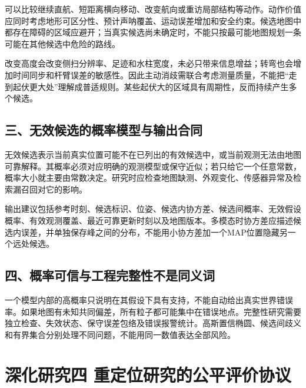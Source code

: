 可以比较继续直航、短距离横向移动、改变航向或重访局部结构等动作。动作价值应同时考虑地形可区分性、预计声呐覆盖、运动误差增加和安全约束。候选地图中都存在障碍的区域应避开；当真实候选尚未确定时，不能只按最可能地图规划一条可能在其他候选中危险的路线。

改变高度会改变侧扫分辨率、足迹和水柱宽度，未必只带来信息增益；转弯也会增加时间同步和杆臂误差的敏感性。因此主动消歧需联合考虑测量质量，不能把``走到起伏更大处''理解成普适规则。某些起伏大的区域具有周期性，反而持续产生多个候选。

\hypertarget{ux4e09ux65e0ux6548ux5019ux9009ux7684ux6982ux7387ux6a21ux578bux4e0eux8f93ux51faux5408ux540c}{%
\subsection{三、无效候选的概率模型与输出合同}\label{ux4e09ux65e0ux6548ux5019ux9009ux7684ux6982ux7387ux6a21ux578bux4e0eux8f93ux51faux5408ux540c}}

无效候选表示当前真实位置可能不在已列出的有效候选中，或当前观测无法由地图可靠解释。其概率必须对应明确的观测模型或保守近似；若只给它一个任意常数，概率大小就主要由常数决定。研究时应检查地图缺测、外观变化、传感器异常及检索漏召回对它的影响。

输出建议包括参考时刻、候选标识、位姿、候选内协方差、候选间概率、无效假设概率、有效观测覆盖、最近可靠更新时刻以及地图版本。多模态时协方差应描述候选内误差，并单独保存峰之间的分布，不能用小协方差加一个MAP位置隐藏另一个远处候选。

\hypertarget{ux56dbux6982ux7387ux53efux4fe1ux4e0eux5de5ux7a0bux5b8cux6574ux6027ux4e0dux662fux540cux4e49ux8bcd}{%
\subsection{四、概率可信与工程完整性不是同义词}\label{ux56dbux6982ux7387ux53efux4fe1ux4e0eux5de5ux7a0bux5b8cux6574ux6027ux4e0dux662fux540cux4e49ux8bcd}}

一个模型内部的高概率只说明在其假设下具有支持，不能自动给出真实世界错误率。如果地图有未知共同偏差，所有粒子都可能集中在错误地点。完整性研究需要独立检查、失效状态、保守误差包络及错误报警统计。高斯置信椭圆、候选间歧义和有界集合分别处理不同问题，不能用同一数值表达全部风险。

\hypertarget{ux6df1ux5316ux7814ux7a76ux56db-ux91cdux5b9aux4f4dux7814ux7a76ux7684ux516cux5e73ux8bc4ux4ef7ux534fux8bae}{%
\section{深化研究四 重定位研究的公平评价协议}\label{ux6df1ux5316ux7814ux7a76ux56db-ux91cdux5b9aux4f4dux7814ux7a76ux7684ux516cux5e73ux8bc4ux4ef7ux534fux8bae}}

